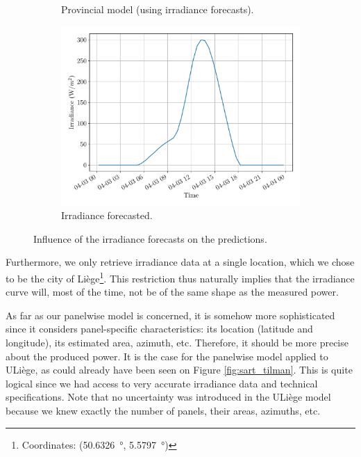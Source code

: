 \documentclass[a4paper, 12pt]{article}
\begin{document}
\begin{figure}[H]
\begin{subfigure}{0.48\textwidth}
		\caption{Provincial model (using irradiance forecasts).}
	\end{subfigure}
	\hspace{0.5em}
	\begin{subfigure}{0.48\textwidth}
		\centering
		\includegraphics[width=\textwidth]{resources/pdf/irradiance_for_for (START_FOR 03-04-2020).pdf}
		\vspace{-0.5em}
		\caption{Irradiance forecasted.}
	\end{subfigure}
	\caption{Influence of the irradiance forecasts on the predictions.}
	\label{fig:irradiance_for_influence}
\end{figure}


Furthermore, we only retrieve irradiance data at a single location, which we chose to be the city of Liège\footnote{Coordinates: (\SI{50.6326}{\degree}, \SI{5.5797}{\degree})}. This restriction thus naturally implies that the irradiance curve will, most of the time, not be of the same shape as the measured power.

As far as our panelwise model is concerned, it is somehow more sophisticated since it considers panel-specific characteristics: its location (latitude and longitude), its estimated area, azimuth, etc. Therefore, it should be more precise about the produced power. It is the case for the panelwise model applied to ULiège, as could already have been seen on Figure \ref{fig:sart_tilman}. This is quite logical since we had access to very accurate irradiance data and technical specifications. Note that no uncertainty was introduced in the ULiège model because we knew exactly the number of panels, their areas, azimuths, etc. 
\end{document}
